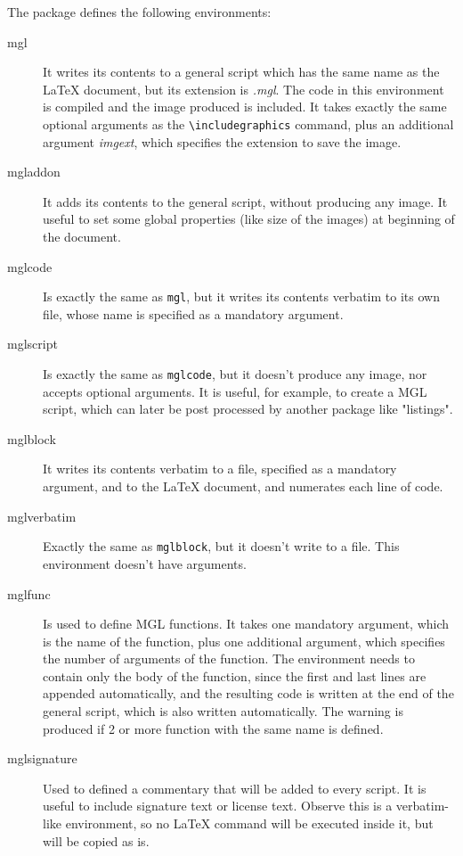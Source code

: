 \documentclass{article}
\begin{document}
The package defines the following environments:
\begin{description}
\item[mgl]
	It writes its contents to a general script which has the same name as the LaTeX document, but its extension is \emph{.mgl}. The code in this environment is compiled and the image produced is included. It takes exactly the same optional arguments as the \texttt{\textbackslash{}includegraphics} command, plus an additional argument \emph{imgext}, which specifies the extension to save the image.
\item[mgladdon]
	It adds its contents to the general script, without producing any image. It useful to set some global properties (like size of the images) at beginning of the document.
\item[mglcode]
	Is exactly the same as \texttt{mgl}, but it writes its contents verbatim to its own file, whose name is specified as a mandatory argument.
\item[mglscript]
	Is exactly the same as \texttt{mglcode}, but it doesn't produce any image, nor accepts optional arguments. It is useful, for example, to create a MGL script, which can later be post processed by another package like "listings".
\item[mglblock]
	It writes its contents verbatim to a file, specified as a mandatory argument, and to the LaTeX document, and numerates each line of code.

\item[mglverbatim]
	Exactly the same as \texttt{mglblock}, but it doesn't write to a file. This environment doesn't have arguments.
\item[mglfunc]
	Is used to define MGL functions. It takes one mandatory argument, which is the name of the function, plus one additional argument, which specifies the number of arguments of the function. The environment needs to contain only the body of the function, since the first and last lines are appended automatically, and the resulting code is written at the end of the general script, which is also written automatically. The warning is produced if 2 or more function with the same name is defined.
\item[mglsignature]
Used to defined a commentary that will be added to every script. It is useful to include signature text or license text. Observe this is a verbatim-like environment, so no \LaTeX{} command will be executed inside it, but will be copied as is.


\end{description}
\end{document}
